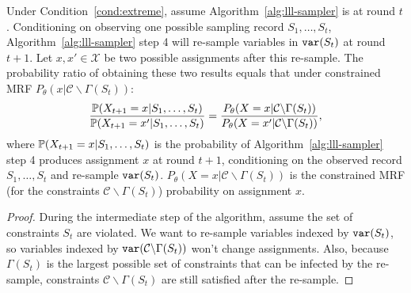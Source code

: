 \begin{lemma} \label{lem:ratio-prob}
Under Condition~\ref{cond:extreme}, assume Algorithm~\ref{alg:lll-sampler} is at round $t$. Conditioning on observing one possible sampling record $S_1,\ldots,S_t$, Algorithm~\ref{alg:lll-sampler} step 4 will re-sample variables in $\mathtt{var}(S_t)$ at round $t+1$. Let $x,x'\in\mathcal{X}$ be two possible assignments after this re-sample.  The probability ratio  of obtaining these two results equals that under constrained MRF
$P_{\theta}(x|\mathcal{C}\backslash \Gamma(S_t))$:
\begin{equation} \label{eq:ratio}
\frac{\mathbb{P}(X_{t+1}= x |S_1,\ldots, S_t)}{\mathbb{P}(X_{t+1}= x'|S_1,\ldots, S_t)} = \frac{P_{\theta}(X = x |\mathcal{C}\backslash \Gamma(S_t))}{P_{\theta}(X = x'|\mathcal{C}\backslash \Gamma(S_t))},
\end{equation} 
where $\mathbb{P}(X_{t+1}= x |S_1,\ldots, S_t)$ is the probability of Algorithm~\ref{alg:lll-sampler} step 4 produces assignment $x$ at round $t+1$, conditioning on the observed record $S_1,\ldots, S_t$ and re-sample $\mathtt{var}(S_t)$. $P_{\theta}(X = x |\mathcal{C}\backslash \Gamma(S_t))$ is the constrained MRF (for the constraints  $\mathcal{C}\backslash \Gamma(S_t)$) probability on assignment $x$.
\begin{proof}
During the intermediate step of the algorithm, assume the set of constraints $S_t$ are violated. We want to re-sample variables indexed by $\mathtt{var}(S_t)$, so  variables indexed by $\mathtt{var}(\mathcal{C}\backslash\Gamma(S_t))$ won't change assignments. Also, because $\Gamma(S_t)$ is the largest possible set of constraints that can be infected by the re-sample, constraints $\mathcal{C}\backslash \Gamma(S_t)$ are still satisfied after the re-sample. 


\end{proof}
\end{lemma}
